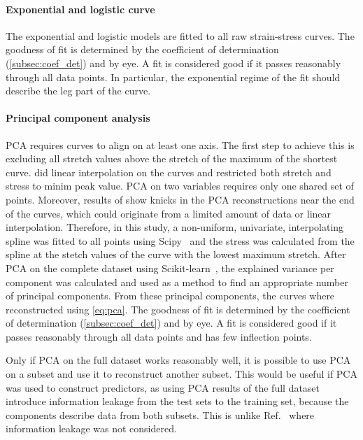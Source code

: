 \paragraph{Exponential and logistic curve}
The exponential and logistic models are fitted to all raw strain-stress curves.
The goodness of fit is determined by the coefficient of determination (\cref{subsec:coef_det}) and by eye.
A fit is considered good if it passes reasonably through all data points.
In particular, the exponential regime of the fit should describe the leg part of the curve.

\paragraph{Principal component analysis}
PCA requires curves to align on at least one axis.
The first step to achieve this is excluding all stretch values above the stretch of the maximum of the shortest curve.
\textcite{Soylu2022} did linear interpolation on the curves and restricted both stretch and stress to minim peak value.
PCA on two variables requires only one shared set of points.
Moreover, results of \citeauthor{Soylu2022} show knicks in the PCA reconstructions near the end of the curves, which could originate from a limited amount of data or linear interpolation.
Therefore, in this study, a non-uniform, univariate, interpolating spline was fitted to all points using Scipy~ and the stress was calculated from the spline at the stetch values of the curve with the lowest maximum stretch.
After PCA on the complete dataset using Scikit-learn~, the explained variance per component was calculated and used as a method to find an appropriate number of principal components.
From these principal components, the curves where reconstructed using \cref{eq:pca}.
The goodness of fit is determined by the coefficient of determination (\cref{subsec:coef_det}) and by eye.
A fit is considered good if it passes reasonably through all data points and has few inflection points.

Only if PCA on the full dataset works reasonably well, it is possible to use PCA on a subset and use it to reconstruct another subset.
This would be useful if PCA was used to construct predictors, as using PCA results of the full dataset introduce information leakage from the test sets to the training set, because the components describe data from both subsets.
This is unlike Ref.~ where information leakage was not considered.

